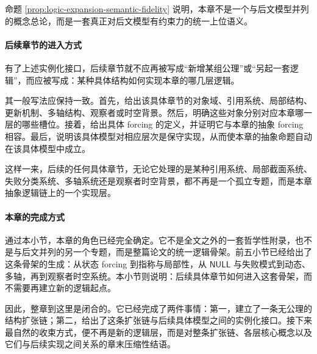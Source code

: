 命题 \ref{prop:logic-expansion-semantic-fidelity} 说明，本章不是一个与后文模型并列的概念总论，而是一套真正对后文模型有约束力的统一上位语义。

\paragraph{后续章节的进入方式}
有了上述实例化接口，后续章节就不应再被写成“新增某组公理”或“另起一套逻辑”，而应被写成：某种具体结构如何实现本章的哪几层逻辑。

其一般写法应保持一致。首先，给出该具体章节的对象域、引用系统、局部结构、更新机制、多轴结构、观察者或时空背景。然后，明确这些对象分别对应本章哪一层的哪些槽位。接着，给出具体 forcing 的定义，并证明它与本章的抽象 forcing 相容。最后，说明该具体模型对相应层次是保守实现，从而使本章的抽象命题自动在该具体模型中成立。

这样一来，后续的任何具体章节，无论它处理的是某种引用系统、局部截面系统、失败分类系统、多轴系统还是观察者时空背景，都不再是一个孤立专题，而是本章抽象逻辑链上的一个实现层。

\paragraph{本章的完成方式}
通过本小节，本章的角色已经完全确定。它不是全文之外的一套哲学性附录，也不是与后文并列的另一个专题，而是整篇论文的统一逻辑骨架。前五小节已经给出了这条骨架的生成：从状态 forcing 到指称与局部性，从 \(\mathsf{NULL}\) 与失败模式到动态、多轴，再到观察者时空系统。本小节则说明：后续具体章节如何进入这套骨架，而不需要再建立新的逻辑起点。

因此，整章到这里是闭合的。它已经完成了两件事情：第一，建立了一条无公理的结构扩张链；第二，给出了这条扩张链与后续具体模型之间的实例化接口。接下来最自然的收束方式，便不再是新的逻辑层，而是对整条扩张链、各层核心概念以及它们与后续实现之间关系的章末压缩性结语。
